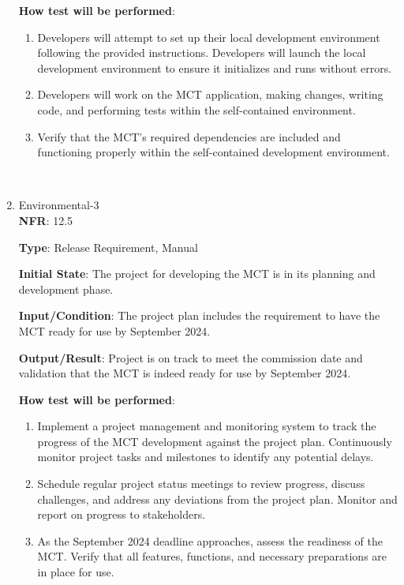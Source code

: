 \documentclass[12pt, titlepage]{article}
\begin{document}
\begin{enumerate}
\textbf{How test will be performed}: 
\begin{enumerate}
    \item Developers will attempt to set up their local development environment following the provided instructions. Developers will launch the local development environment to ensure it initializes and runs without errors.
    \item Developers will work on the MCT application, making changes, writing code, and performing tests within the self-contained environment.
    \item Verify that the MCT's required dependencies are included and functioning properly within the self-contained development environment.
\end{enumerate}
\\

\item Environmental-3 \\

\textbf{NFR}: 12.5

\textbf{Type}: Release Requirement, Manual

\textbf{Initial State}: The project for developing the MCT is in its planning and development phase.

\textbf{Input/Condition}: The project plan includes the requirement to have the MCT ready for use by September 2024.

\textbf{Output/Result}: Project is on track to meet the commission date and validation that the MCT is indeed ready for use by September 2024.

\textbf{How test will be performed}: 
\begin{enumerate}
    \item Implement a project management and monitoring system to track the progress of the MCT development against the project plan. Continuously monitor project tasks and milestones to identify any potential delays.
    \item Schedule regular project status meetings to review progress, discuss challenges, and address any deviations from the project plan. Monitor and report on progress to stakeholders.
    \item As the September 2024 deadline approaches, assess the readiness of the MCT. Verify that all features, functions, and necessary preparations are in place for use.

\end{enumerate}



\\


\end{enumerate}
\end{document}
